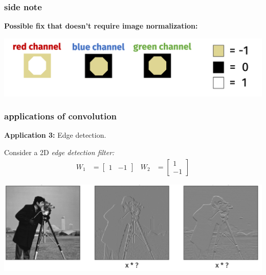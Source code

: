 \documentclass[handout,compress]{beamer}
\begin{document}
\begin{frame}
	\frametitle{side note}
	\textbf{Possible fix that doesn't require image normalization:}
	\begin{center}
		\includegraphics[width=.8\textwidth]{ying_fix.png}
	\end{center}
\end{frame}

\begin{frame}
	\frametitle{applications of convolution}
	\small
	\textbf{Application 3:} Edge detection.
	
	Consider a 2D \emph{edge detection filter:}
	\begin{align*}
	W_1 &= \begin{bmatrix}
	1 & -1
	\end{bmatrix} & 	
	W_2 &= \begin{bmatrix}
	1\\
	-1
	\end{bmatrix}
	\end{align*}
	\begin{center}
		\includegraphics[width=\textwidth]{conv_test.png}
	\end{center}
\end{frame}
\end{document}
